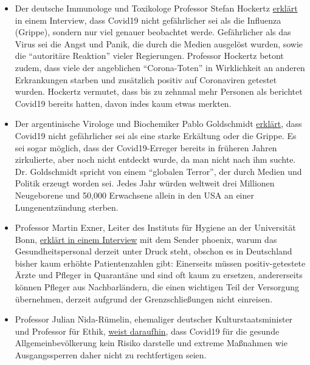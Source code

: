 \begin{itemize}
\tightlist
\item
  Der deutsche Immunologe und Toxikologe Professor Stefan Hockertz
  \href{https://www.youtube.com/watch?v=7wfb-B0BWmo}{erklärt} in einem
  Interview, dass Covid19 nicht gefährlicher sei als die Influenza
  (Grippe), sondern nur viel genauer beobachtet werde. Gefährlicher als
  das Virus sei die Angst und Panik, die durch die Medien ausgelöst
  wurden, sowie die ``autoritäre Reaktion'' vieler Regierungen.
  Professor Hockertz betont zudem, dass viele der angeblichen
  ``Corona-Toten'' in Wirklichkeit an anderen Erkrankungen starben und
  zusätzlich positiv auf Coronaviren getestet wurden. Hockertz vermutet,
  dass bis zu zehnmal mehr Personen als berichtet Covid19 bereits
  hatten, davon indes kaum etwas merkten.
\item
  Der argentinische Virologe und Biochemiker Pablo Goldschmidt
  \href{https://www.clarin.com/buena-vida/coronavirus-panico-injustificado-dice-virologo-argentino-francia_0_yVcmJ4RM.html}{erklärt},
  dass Covid19 nicht gefährlicher sei als eine starke Erkältung oder die
  Grippe. Es sei sogar möglich, dass der Covid19-Erreger bereits in
  früheren Jahren zirkulierte, aber noch nicht entdeckt wurde, da man
  nicht nach ihm suchte. Dr. Goldschmidt spricht von einem ``globalen
  Terror'', der durch Medien und Politik erzeugt worden sei. Jedes Jahr
  würden weltweit drei Millionen Neugeborene und 50,000 Erwachsene
  allein in den USA an einer Lungenentzündung sterben.
\item
  Professor Martin Exner, Leiter des Instituts für Hygiene an der
  Universität Bonn,
  \href{https://www.youtube.com/watch?v=9mI9trSm3PY}{erklärt in einem
  Interview} mit dem Sender phoenix, warum das Gesundheitspersonal
  derzeit unter Druck steht, obschon es in Deutschland bisher kaum
  erhöhte Patientenzahlen gibt: Einerseits müssen positiv-getestete
  Ärzte und Pfleger in Quarantäne und sind oft kaum zu ersetzen,
  andererseits können Pfleger aus Nachbarländern, die einen wichtigen
  Teil der Versorgung übernehmen, derzeit aufgrund der Grenzschließungen
  nicht einreisen.
\item
  Professor Julian Nida-Rümelin, ehemaliger deutscher
  Kulturstaatsminister und Professor für Ethik,
  \href{https://www.zdf.de/nachrichten/zdf-morgenmagazin/julian-nida-ruemelin-zur-corona-krise-100.html}{weist
  daraufhin}, dass Covid19 für die gesunde Allgemeinbevölkerung kein
  Risiko darstelle und extreme Maßnahmen wie Ausgangssperren daher nicht
  zu rechtfertigen seien.

\end{itemize}
